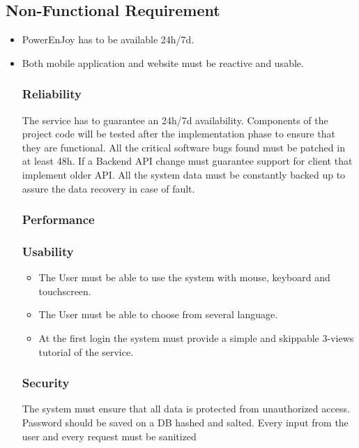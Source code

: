 \documentclass[english]{article}
\begin{document}
\subsection{Non-Functional Requirement}

\begin{itemize}
	\item PowerEnJoy has to be available 24h/7d.
	\item Both mobile application and website must be reactive and usable.
	
\subsubsection{Reliability}%

The service has to guarantee an 24h/7d availability. Components of the project code will be tested after the implementation phase to ensure that they are functional. 
All the critical software bugs found must be patched in at least 48h.
If a Backend API change must guarantee support for client that implement older API.
All the system data must be constantly backed up to assure the data recovery in case of fault.


\subsubsection{Performance}

\subsubsection{Usability}
\begin{itemize}
	\item The User must be able to use the system with mouse, keyboard and touchscreen.
	\item The User must be able to choose from several language.
	\item At the first login the system must provide a simple and skippable 3-views tutorial of the service.
\end{itemize}



\subsubsection{Security}

The system must ensure that all data is protected from unauthorized
access. Password should be saved on a DB hashed and salted.
Every input from the user and every request must be sanitized 

\end{itemize}
\end{document}
